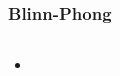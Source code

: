 \begin{frame}
\frametitle{Blinn-Phong}
\begin{columns}




\begin{itemize}
\item
\end{itemize}




\end{columns}
\end{frame}
